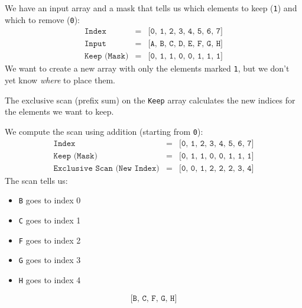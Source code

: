 \begin{examplebox}
    We have an input array and a mask that tells us which elements to keep (\texttt{1}) and which to remove (\texttt{0}):
    \begin{equation*}
        \begin{array}{rcl}
            \texttt{Index}          & = & \texttt{[0, 1, 2, 3, 4, 5, 6, 7]} \\ [.5em]
            \texttt{Input}          & = & \texttt{[A, B, C, D, E, F, G, H]} \\ [.5em]
            \texttt{Keep (Mask)}    & = & \texttt{[0, 1, 1, 0, 0, 1, 1, 1]}
        \end{array}
    \end{equation*}
    We want to create a new array with only the elements marked \texttt{1}, but we don't yet know \emph{where} to place them.

    The exclusive scan (prefix sum) on the \texttt{Keep} array calculates the new indices for the elements we want to keep.

    We compute the scan using addition (starting from \texttt{0}):
    \begin{equation*}
        \begin{array}{rcl}
            \texttt{Index}                      & = & \texttt{[0, 1, 2, 3, 4, 5, 6, 7]} \\ [.5em]
            \texttt{Keep (Mask)}                & = & \texttt{[0, 1, 1, 0, 0, 1, 1, 1]} \\ [.5em]
            \texttt{Exclusive Scan (New Index)} & = & \texttt{[0, 0, 1, 2, 2, 2, 3, 4]}
        \end{array}
    \end{equation*}
    The scan tells us:
    \begin{itemize}
        \item \texttt{B} goes to index 0
        \item \texttt{C} goes to index 1
        \item \texttt{F} goes to index 2
        \item \texttt{G} goes to index 3
        \item \texttt{H} goes to index 4
    \end{itemize}
    \begin{equation*}
        \texttt{[B, C, F, G, H]}
    \end{equation*}
\end{examplebox}


